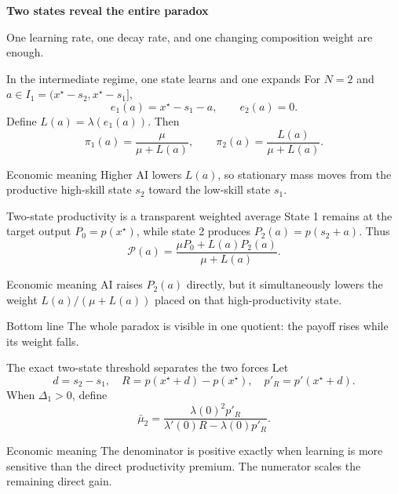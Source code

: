 \documentclass[aspectratio=169,11pt]{beamer}
\newcommand{\calP}{\mathcal{P}}
\newcommand{\econmeaning}[1]{%
  \begin{block}{Economic meaning}
  #1
  \end{block}}
\newcommand{\bottomline}[1]{%
  \begin{alertblock}{Bottom line}
  #1
  \end{alertblock}}
\begin{document}

\begin{frame}[plain]
  \vspace{23mm}
  {\color{white}\Huge\bfseries Two states reveal the entire paradox\par}
  \vspace{8mm}
  {\color{white!82}\Large One learning rate, one decay rate, and one changing composition weight are enough.\par}
\end{frame}

\begin{frame}{In the intermediate regime, one state learns and one expands}
For $N=2$ and $a\in I_1=(x^\star-s_2,x^\star-s_1]$,
\[
e_1(a)=x^\star-s_1-a,
\qquad
e_2(a)=0.
\]
Define $L(a)=\lambda(e_1(a))$. Then
\[
\boxed{\pi_1(a)=\frac{\mu}{\mu+L(a)},
\qquad
\pi_2(a)=\frac{L(a)}{\mu+L(a)}.}
\]
\econmeaning{Higher AI lowers $L(a)$, so stationary mass moves from the productive high-skill state $s_2$ toward the low-skill state $s_1$.}
\end{frame}

\begin{frame}{Two-state productivity is a transparent weighted average}
State 1 remains at the target output $P_0=p(x^\star)$, while state 2 produces $P_2(a)=p(s_2+a)$. Thus
\[
\boxed{
\calP(a)=
\frac{\mu P_0+L(a)P_2(a)}{\mu+L(a)}.}
\]
\econmeaning{AI raises $P_2(a)$ directly, but it simultaneously lowers the weight $L(a)/(\mu+L(a))$ placed on that high-productivity state.}
\bottomline{The whole paradox is visible in one quotient: the payoff rises while its weight falls.}
\end{frame}

\begin{frame}{The exact two-state threshold separates the two forces}
Let
\[
d=s_2-s_1,
\quad
R=p(x^\star+d)-p(x^\star),
\quad
p'_R=p'(x^\star+d).
\]
When $\Delta_1>0$, define
\[
\boxed{
\bar\mu_2=
\frac{\lambda(0)^2p'_R}
{\lambda'(0)R-\lambda(0)p'_R}.}
\]
\econmeaning{The denominator is positive exactly when learning is more sensitive than the direct productivity premium. The numerator scales the remaining direct gain.}
\end{frame}
\end{document}
